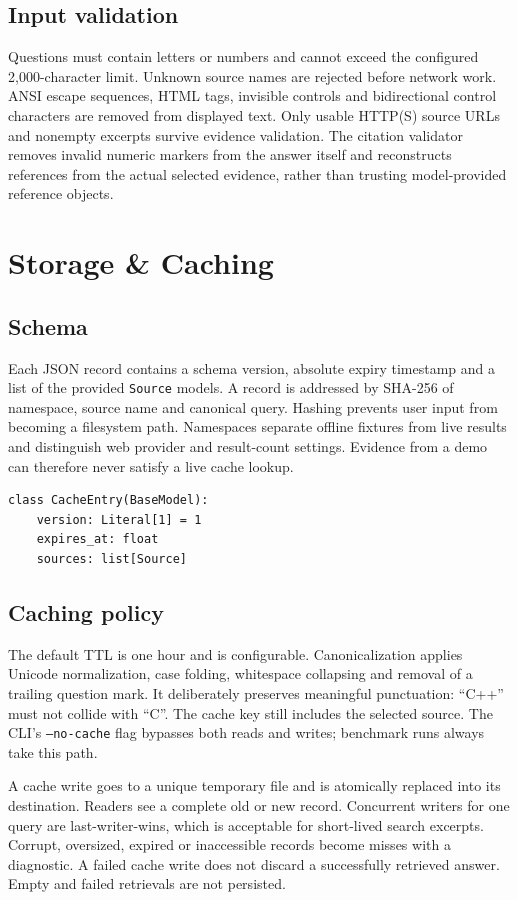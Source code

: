 \documentclass[11pt,a4paper]{article}
\begin{document}
\subsection{Input validation}
Questions must contain letters or numbers and cannot exceed the configured 2,000-character limit. Unknown source names are rejected before network work. ANSI escape sequences, HTML tags, invisible controls and bidirectional control characters are removed from displayed text. Only usable HTTP(S) source URLs and nonempty excerpts survive evidence validation. The citation validator removes invalid numeric markers from the answer itself and reconstructs references from the actual selected evidence, rather than trusting model-provided reference objects.

\clearpage
\section{Storage \& Caching}
\subsection{Schema}
Each JSON record contains a schema version, absolute expiry timestamp and a list of the provided \texttt{Source} models. A record is addressed by SHA-256 of namespace, source name and canonical query. Hashing prevents user input from becoming a filesystem path. Namespaces separate offline fixtures from live results and distinguish web provider and result-count settings. Evidence from a demo can therefore never satisfy a live cache lookup.

\begin{lstlisting}[style=python,numbers=none]
class CacheEntry(BaseModel):
    version: Literal[1] = 1
    expires_at: float
    sources: list[Source]
\end{lstlisting}

\subsection{Caching policy}
The default TTL is one hour and is configurable. Canonicalization applies Unicode normalization, case folding, whitespace collapsing and removal of a trailing question mark. It deliberately preserves meaningful punctuation: ``C++'' must not collide with ``C''. The cache key still includes the selected source. The CLI's \texttt{--no-cache} flag bypasses both reads and writes; benchmark runs always take this path.

A cache write goes to a unique temporary file and is atomically replaced into its destination. Readers see a complete old or new record. Concurrent writers for one query are last-writer-wins, which is acceptable for short-lived search excerpts. Corrupt, oversized, expired or inaccessible records become misses with a diagnostic. A failed cache write does not discard a successfully retrieved answer. Empty and failed retrievals are not persisted.
\end{document}
